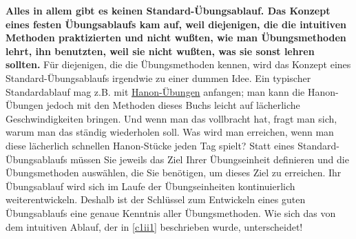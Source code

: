 \textbf{Alles in allem gibt es keinen Standard-Übungsablauf.
Das Konzept eines festen Übungsablaufs kam auf, weil diejenigen, die die intuitiven Methoden praktizierten und nicht wußten, wie man Übungsmethoden lehrt, ihn benutzten, weil sie nicht wußten, was sie sonst lehren sollten.}
Für diejenigen, die die Übungsmethoden kennen, wird das Konzept eines Standard-Übungsablaufs irgendwie zu einer dummen Idee.
Ein typischer Standardablauf mag z.B. mit \hyperref[c1iii7h]{Hanon-Übungen} anfangen; man kann die Hanon-Übungen jedoch mit den Methoden dieses Buchs leicht auf lächerliche Geschwindigkeiten bringen.
Und wenn man das vollbracht hat, fragt man sich, warum man das ständig wiederholen soll.
Was wird man erreichen, wenn man diese lächerlich schnellen Hanon-Stücke jeden Tag spielt?
Statt eines Standard-Übungsablaufs müssen Sie jeweils das Ziel Ihrer Übungseinheit definieren und die Übungsmethoden auswählen, die Sie benötigen, um dieses Ziel zu erreichen.
Ihr Übungsablauf wird sich im Laufe der Übungseinheiten kontinuierlich weiterentwickeln.
Deshalb ist der Schlüssel zum Entwickeln eines guten Übungsablaufs eine genaue Kenntnis aller Übungsmethoden.
Wie sich das von dem intuitiven Ablauf, der in \hyperref[c1ii1]{\autoref{c1ii1}} beschrieben wurde, unterscheidet!




